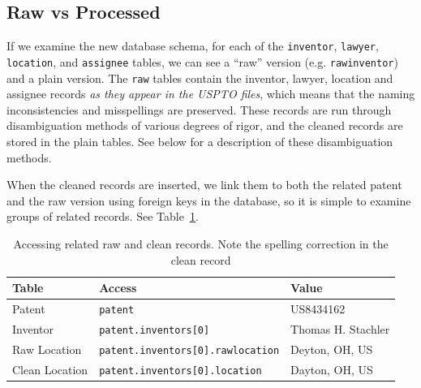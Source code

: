 \subsection{Raw vs Processed}

If we examine the new database schema, for each of the \verb`inventor`,
\verb`lawyer`, \verb`location`, and \verb`assignee` tables, we can see a
``raw'' version (e.g. \verb`rawinventor`) and a plain version. The \verb`raw`
tables contain the inventor, lawyer, location and assignee records \emph{as
they appear in the USPTO files}, which means that the naming inconsistencies
and misspellings are preserved. These records are run through disambiguation
methods of various degrees of rigor, and the cleaned records are stored in the
plain tables. See below for a description of these disambiguation methods.

When the cleaned records are inserted, we link them to both the related patent
and the raw version using foreign keys in the database, so it is simple to
examine groups of related records. See Table~\ref{table:rawclean}.

\begin{table}
\center
\begin{tabular}{| l | l | l |}
    \hline
    Table & Access & Value \\
    \hline
    Patent & \verb`patent` & US8434162 \\
    Inventor & \verb`patent.inventors[0]` & Thomas H. Stachler \\
    Raw Location & \verb`patent.inventors[0].rawlocation` & Deyton, OH, US \\
    Clean Location & \verb`patent.inventors[0].location` & Dayton, OH, US \\
    \hline
\end{tabular}
\caption{Accessing related raw and clean records. Note the spelling correction in the clean record}
\label{table:rawclean}
\end{table}

